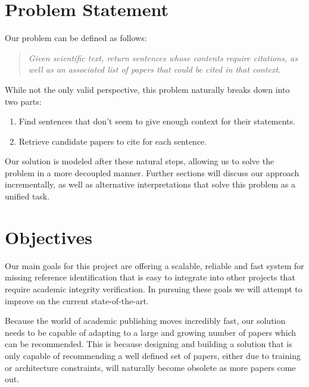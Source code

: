 \documentclass[12pt,a4paper]{report}
\begin{document}
\section{Problem Statement} \label{problem_statement}

Our problem can be defined as follows: 

\begin{quote}
\textit{Given scientific text, return sentences whose contents require citations, as well as an associated list of papers that could be cited in that context.}
\end{quote}

While not the only valid perspective, this problem naturally breaks down into two parts:

\begin{enumerate}
    \item Find sentences that don't seem to give enough context for their statements.
    \item Retrieve candidate papers to cite for each sentence. 
\end{enumerate}

Our solution is modeled after these natural steps, allowing us to solve the problem in a more decoupled manner. Further sections will discuss our approach incrementally, as well as alternative interpretations that solve this problem as a unified task.

\section{Objectives} \label{objectives}

Our main goals for this project are offering a scalable, reliable and fast system for missing reference identification that is easy to integrate into other projects that require academic integrity verification. In pursuing these goals we will attempt to improve on the current state-of-the-art.

Because the world of academic publishing moves incredibly fast, our solution needs to be capable of adapting to a large and growing number of papers which can be recommended. This is because designing and building a solution that is only capable of recommending a well defined set of papers, either due to training or architecture constraints, will naturally become obsolete as more papers come out.
\end{document}
